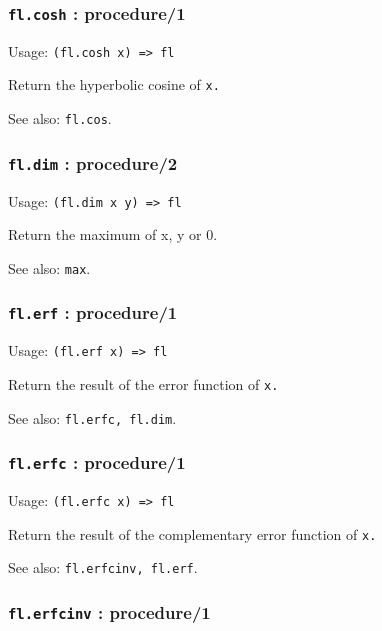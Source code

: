 \documentclass[
]{article}
\newcommand{\passthrough}[1]{#1}
\begin{document}
\hypertarget{fl.cosh-procedure1}{%
\subsubsection{\texorpdfstring{\texttt{fl.cosh} :
procedure/1}{fl.cosh : procedure/1}}\label{fl.cosh-procedure1}}

Usage: \passthrough{\lstinline!(fl.cosh x) => fl!}

Return the hyperbolic cosine of \passthrough{\lstinline!x.!}

See also: \passthrough{\lstinline!fl.cos!}.

\hypertarget{fl.dim-procedure2}{%
\subsubsection{\texorpdfstring{\texttt{fl.dim} :
procedure/2}{fl.dim : procedure/2}}\label{fl.dim-procedure2}}

Usage: \passthrough{\lstinline!(fl.dim x y) => fl!}

Return the maximum of x, y or 0.

See also: \passthrough{\lstinline!max!}.

\hypertarget{fl.erf-procedure1}{%
\subsubsection{\texorpdfstring{\texttt{fl.erf} :
procedure/1}{fl.erf : procedure/1}}\label{fl.erf-procedure1}}

Usage: \passthrough{\lstinline!(fl.erf x) => fl!}

Return the result of the error function of \passthrough{\lstinline!x.!}

See also: \passthrough{\lstinline!fl.erfc, fl.dim!}.

\hypertarget{fl.erfc-procedure1}{%
\subsubsection{\texorpdfstring{\texttt{fl.erfc} :
procedure/1}{fl.erfc : procedure/1}}\label{fl.erfc-procedure1}}

Usage: \passthrough{\lstinline!(fl.erfc x) => fl!}

Return the result of the complementary error function of
\passthrough{\lstinline!x.!}

See also: \passthrough{\lstinline!fl.erfcinv, fl.erf!}.

\hypertarget{fl.erfcinv-procedure1}{%
\subsubsection{\texorpdfstring{\texttt{fl.erfcinv} :
procedure/1}{fl.erfcinv : procedure/1}}\label{fl.erfcinv-procedure1}}
\end{document}
